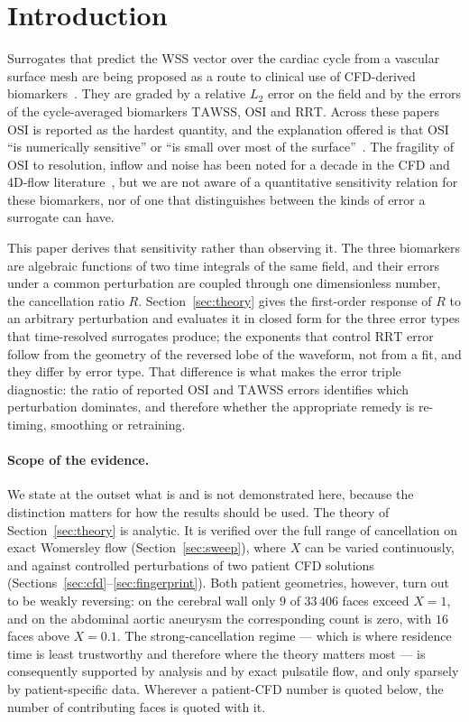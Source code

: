 \documentclass[11pt,a4paper]{article}
\newcommand{\TAWSS}{\mathrm{TAWSS}}
\newcommand{\OSI}{\mathrm{OSI}}
\newcommand{\RRT}{\mathrm{RRT}}
\begin{document}
\section{Introduction}

Surrogates that predict the WSS vector over the cardiac cycle from a vascular
surface mesh are being proposed as a route to clinical use of CFD-derived
biomarkers~\cite{npj2026,jekenrico2025,rhsia2026,rygiel2025}. They are
graded by a relative $L_2$ error on the field and by the errors of the
cycle-averaged biomarkers $\TAWSS$, $\OSI$ and $\RRT$. Across these papers
$\OSI$ is reported as the hardest quantity, and the explanation offered is
that $\OSI$ ``is numerically sensitive'' or ``is small over most of the
surface''~\cite{rhsia2026,aaa2025}. The fragility of $\OSI$ to resolution,
inflow and noise has been noted for a decade in the CFD and 4D-flow
literature~\cite{sarrami2016,bergersen2017,mri2016}, but we are not aware of
a quantitative sensitivity relation for these biomarkers, nor of one that
distinguishes between the kinds of error a surrogate can have.

This paper derives that sensitivity rather than observing it. The three
biomarkers are algebraic functions of two time integrals of the same field,
and their errors under a common perturbation are coupled through one
dimensionless number, the cancellation ratio $R$. Section~\ref{sec:theory}
gives the first-order response of $R$ to an arbitrary perturbation and
evaluates it in closed form for the three error types that time-resolved
surrogates produce; the exponents that control $\RRT$ error follow from the
geometry of the reversed lobe of the waveform, not from a fit, and they
differ by error type. That difference is what makes the error triple
diagnostic: the ratio of reported $\OSI$ and $\TAWSS$ errors identifies which
perturbation dominates, and therefore whether the appropriate remedy is
re-timing, smoothing or retraining.

\paragraph{Scope of the evidence.}
We state at the outset what is and is not demonstrated here, because the
distinction matters for how the results should be used. The theory of
Section~\ref{sec:theory} is analytic. It is verified over the full range of
cancellation on exact Womersley flow (Section~\ref{sec:sweep}), where $X$ can
be varied continuously, and against controlled perturbations of two patient
CFD solutions (Sections~\ref{sec:cfd}--\ref{sec:fingerprint}). Both patient
geometries, however, turn out to be weakly reversing: on the cerebral wall
only $9$ of $33\,406$ faces exceed $X=1$, and on the abdominal aortic
aneurysm the corresponding count is zero, with $16$ faces above $X=0.1$. The
strong-cancellation regime --- which is where residence time is least
trustworthy and therefore where the theory matters most --- is consequently
supported by analysis and by exact pulsatile flow, and only sparsely by
patient-specific data. Wherever a patient-CFD number is quoted below, the
number of contributing faces is quoted with it.
\end{document}
